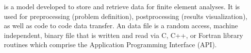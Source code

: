 \exo{} is a model developed to store and retrieve data for finite
element analyses. It is used for preprocessing (problem definition),
postprocessing (results visualization), as well as code to code data
transfer. An \exo{} data file is a random access, machine independent,
binary file that is written and read via C, C++, or Fortran library
routines which comprise the Application Programming Interface (API).
